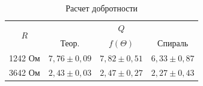 \documentclass[12pt]{kiarticle}
\begin{document}
\begin{table}[h!]%
	\centering
	\caption{Расчет добротности}
	\begin{tabular}{|c|c|c|c|}
		\hline
		\multirow{2}{*}{$ R $} & \multicolumn{3}{|c|}{$ Q $} \\
		\cline{2-4}
		& Теор. & $ f(\Theta) $ & Спираль \\
		\hline
		1242 Ом & $ 7,76 \pm 0,09 $ & $ 7,82 \pm 0,51 $ & $ 6,33 \pm 0,87 $ \\
		\hline
		3642 Ом  & $ 2,43 \pm 0,03 $ & $ 2,47 \pm 0,27 $  & $ 2,27 \pm 0,43 $ \\
		\hline
	\end{tabular}
\end{table}
\end{document}
